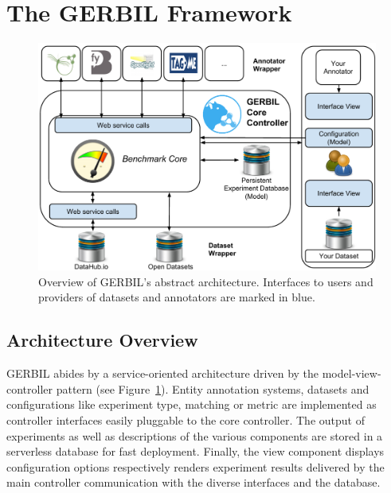 \section{The GERBIL Framework}
\label{sec:architecture}
\begin{figure}[tb]
\centering
\includegraphics[width=0.6\linewidth]{chapter_three/benchmarking/WWW_GERBIL/GERBIL_new_architectur}
\caption{Overview of GERBIL's abstract architecture. Interfaces to users and providers of datasets and annotators are marked in blue.
}
\label{fig:architecture}
\end{figure}


\subsection{Architecture Overview}
GERBIL abides by a service-oriented architecture driven by the model-view-controller pattern (see Figure~\ref{fig:architecture}).
Entity annotation systems, datasets and configurations like experiment type, matching or metric are implemented as controller interfaces easily pluggable to the core controller. 
The output of experiments as well as descriptions of the various components are stored in a serverless database for fast deployment. %
Finally, the view component displays configuration options respectively renders experiment results delivered by the main controller communication with the diverse interfaces and the database.




